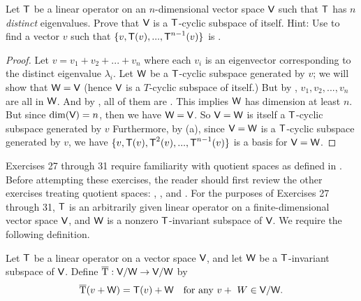 \begin{exercise} \label{exercise 5.4.26}
Let \(\textsf{T}\) be a linear operator on an \(n\)-dimensional vector space \(\textsf{V}\) such that \(\textsf{T}\) has \(n\) \emph{distinct} eigenvalues.
Prove that \(\textsf{V}\) is a \(\textsf{T}\)-cyclic subspace of itself.
Hint: Use  to find a vector \(v\) such that \(\{ v, \textsf{T}(v), ..., \textsf{T}^{n-1}(v) \}\) is \LID{}.
\end{exercise}

\begin{proof}
Let \(v = v_1 + v_2 + ... + v_n\) where each \(v_i\) is an eigenvector corresponding to the distinct eigenvalue \(\lambda_i\).
Let \(\textsf{W}\) be a \(\textsf{T}\)-cyclic subspace generated by \(v\); we will show that \(\textsf{W} = \textsf{V}\) (hence \(\textsf{V}\) is a \(T\)-cyclic subspace of itself.)
But by , \(v_1, v_2, ..., v_n\) are all in \(\textsf{W}\).
And by , all of them are \LID{}.
This implies \(\textsf{W}\) has dimension at least \(n\).
But since \(\dim(\textsf{V}) = n\), then we have \(\textsf{W} = \textsf{V}\).
So \(\textsf{V} = \textsf{W}\) is itself a \(\textsf{T}\)-cyclic subspace generated by \(v\)
Furthermore, by (a), since \(\textsf{V} = \textsf{W}\) is a \(\textsf{T}\)-cyclic subspace generated by \(v\), we have \(\{ v, \textsf{T}(v), \textsf{T}^2(v), ..., \textsf{T}^{n - 1}(v) \}\) is a basis for \(\textsf{V} = \textsf{W}\).
\end{proof}

Exercises 27 through 31 require familiarity with quotient spaces as defined in .
Before attempting these exercises, the reader should first review the other exercises treating quotient spaces:
, , and .
For the purposes of Exercises 27 through 31, \(\textsf{T}\) is an arbitrarily given linear operator on a finite-dimensional vector space \(\textsf{V}\), and \(\textsf{W}\) is a nonzero \(\textsf{T}\)-invariant subspace of \(\textsf{V}\).
We require the following definition.

\newcommand{\Tover}{\mathrm{\overline{T}}}

\setcounter{additional definition}{3} %
\begin{additional definition} \label{adef 5.4}
Let \(\textsf{T}\) be a linear operator on a vector space \(\textsf{V}\), and let \(\textsf{W}\) be a \(\textsf{T}\)-invariant subspace of \(\textsf{V}\).
Define \(\Tover: \V/\W \to \V/\W\) by
\[
    \Tover(v + \W) = \T(v) + \W \quad \text{for any } v +\ W \in \V/\W. 
\]
\end{additional definition}

